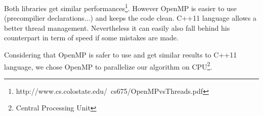 Both libraries get similar performances\footnote{http://www.cs.colostate.edu/~cs675/OpenMPvsThreads.pdf}. However OpenMP is easier to use (precompilier declarations...) and keeps the code clean. C++11 language allows a better thread management. Nevertheless it can easily also fall behind his counterpart in term of speed if some mistakes are made.

Considering that OpenMP is safer to use and get similar results to C++11 language, we chose OpenMP to parallelize our algorithm on CPU\footnote{Central Processing Unit}.
